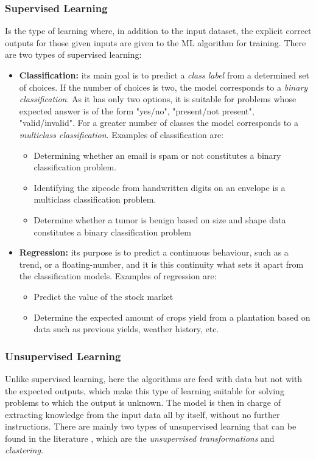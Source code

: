 \subsubsection{Supervised Learning}
Is the type of learning where, in addition to the input dataset, the explicit correct outputs for those given inputs are given to the \ac{ML} algorithm for training. There are two types of supervised learning:
\begin{itemize}
    \item \textbf{Classification:} its main goal is to predict a \emph{class label} from a determined set of choices. If the number of choices is two, the model corresponds to a \emph{binary classification}. As it has only two options, it is suitable for problems whose expected answer is of the form "yes/no", "present/not present", "valid/invalid". For a greater number of classes the model corresponds to a \emph{multiclass classification}. Examples of classification are:
        \begin{itemize}
            \item Determining whether an email is spam or not constitutes a binary classification problem.
            \item Identifying the zipcode from handwritten digits on an envelope is a multiclass classification problem.
            \item Determine whether a tumor is benign based on size and shape data constitutes a binary classification problem
        \end{itemize}
    \item \textbf{Regression:} its purpose is to predict a continuous behaviour, such as a trend, or a floating-number, and it is this continuity what sets it apart from the classification models. Examples of regression are:
        \begin{itemize}
            \item Predict the value of the stock market
            \item Determine the expected amount of crops yield from a plantation based on data such as previous yields, weather history, etc.
        \end{itemize}
\end{itemize}

\subsubsection{Unsupervised Learning}
Unlike supervised learning, here the algorithms are feed with data but not with the expected outputs, which make this type of learning suitable for solving problems to which the output is unknown. The model is then in charge of extracting knowledge from the input data all by itself, without no further instructions. There are mainly two types of unsupervised learning that can be found in the literature \cite{Andreas}, which are the \emph{unsupervised transformations} and \emph{clustering}.

